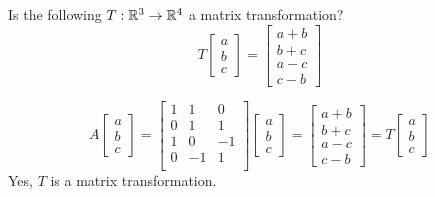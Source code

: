 \documentclass[pdf,9pt]{beamer}
\begin{document}
\begin{frame}[fragile]
\begin{problem}[Revisited]
    Is the following $T:\mathbb{R}^3\rightarrow\mathbb{R}^4$ a matrix transformation?
    \[
	T\left[\begin{array}{c} a \\ b\\ c\end{array}\right]
	=\left[ \begin{array}{c}
	a+b \\ b+c \\ a-c\\ c-b \end{array}\right]
    \]
\end{problem}
\vfill
\pause
\begin{solution}
\[
	A\left[\begin{array}{r} a \\ b\\ c \end{array}\right]
	=
	\left[ \begin{array}{rrr}
		1 & 1 & 0 \\
		0 & 1 & 1 \\
		1 & 0 & -1 \\
		0 & -1 & 1 \\
	    \end{array}
	\right]
	\left[\begin{array}{r} a \\ b\\ c \end{array}\right]
	=
	\left[ \begin{array}{c}
	a+b \\ b+c \\ a-c\\ c-b \end{array}\right]
	=
	T\left[\begin{array}{c} a \\ b\\ c\end{array}\right]
   \]
    \pause
    Yes, $T$ is a matrix transformation.
    \myQED
\end{solution}
\end{frame}
\end{document}
